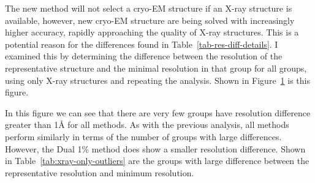 The new method will not select a cryo-EM structure if an X-ray structure is
available, however, new cryo-EM structure are being solved with increasingly
higher accuracy, rapidly approaching the quality of X-ray structures. This is a
potential reason for the differences found in Table~\ref{tab-res-diff-details}.
I examined this by determining the difference between the resolution of the
representative structure and the minimal resolution in that group for all
groups, using only X-ray structures and repeating the analysis. Shown in
Figure~\ref{fig:xray-only-diff} is this figure.

\begin{figure}
  \caption{}
  \label{fig:xray-only-diff}
\end{figure}

In this figure we can see that there are very few groups have resolution
difference greater than 1\AA{} for all methods. As with the previous analysis, all
methods perform similarly in terms of the number of groups with large
differences. However, the Dual 1\% method does show a smaller resolution
difference. Shown in Table~\ref{tab:xray-only-outliers} are the groups with large
difference between the representative resolution and minimum resolution.

